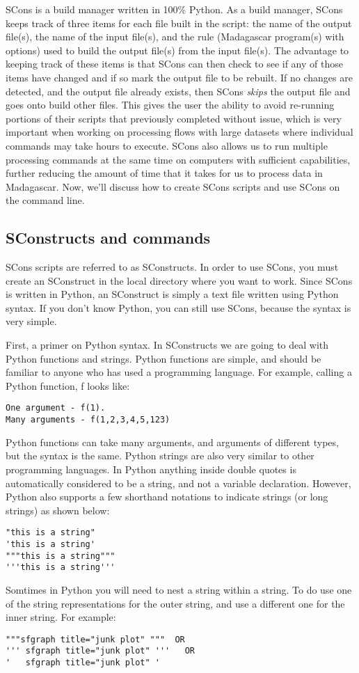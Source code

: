 SCons is a build manager written in 100\% Python.  As a build manager, SCons keeps track of three items for each file built in the script: the name of the output file(s), the name of the input file(s), and the rule (Madagascar program(s) with options) used to build the output file(s) from the input file(s).  The advantage to keeping track of these items is that SCons can then check to see if any of those items have changed and if so mark the output file to be rebuilt.  If no changes are detected, and the output file already exists, then SCons \emph{skips} the output file and goes onto build other files.  This gives the user the ability to avoid re-running portions of their scripts that previously completed without issue, which is very important when working on processing flows with large datasets where individual commands may take hours to execute.  SCons also allows us to run multiple processing commands at the same time on computers with sufficient capabilities, further reducing the amount of time that it takes for us to process data in Madagascar.  Now, we'll discuss how to create SCons scripts and use SCons on the command line.

\subsection{SConstructs and commands}

SCons scripts are referred to as SConstructs.  In order to use SCons, you must create an SConstruct in the local directory where you want to work. Since SCons is written in Python, an SConstruct is simply a text file written using Python syntax.  If you don't know Python, you can still use SCons, because the syntax is very simple.

First, a primer on Python syntax.  In SConstructs we are going to deal with Python functions and strings.  Python functions are simple, and should be familiar to anyone who has used a programming language.  For example, calling a Python function, f looks like:
\begin{verbatim}
One argument - f(1).
Many arguments - f(1,2,3,4,5,123)
\end{verbatim}
Python functions can take many arguments, and arguments of different types, but the syntax is the same.  Python strings are also very similar to other programming languages.  In Python anything inside double quotes is automatically considered to be a string, and not a variable declaration.  However, Python also supports a few shorthand notations to indicate strings (or long strings) as shown below:
\begin{verbatim}
"this is a string"
'this is a string'
"""this is a string"""
'''this is a string'''
\end{verbatim}
Somtimes in Python you will need to nest a string within a string.  To do use one of the string representations for the outer string, and use a different one for the inner string.  For example:
\begin{verbatim}
"""sfgraph title="junk plot" """  OR
''' sfgraph title="junk plot" '''   OR
'   sfgraph title="junk plot" ' 
\end{verbatim}


